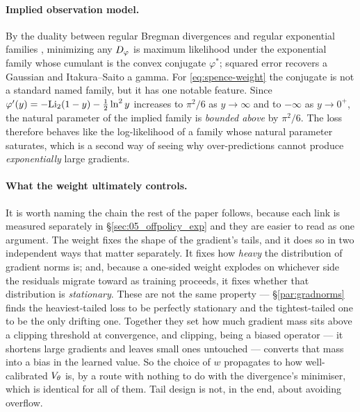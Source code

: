 \paragraph{Implied observation model.}
By the duality between regular Bregman divergences and regular exponential
families \citep{banerjee2005clustering,azoury2001relative}, minimizing any $D_{\varphi}$ is maximum
likelihood under the exponential family whose cumulant is the convex conjugate
$\varphi^{*}$; squared error recovers a Gaussian and Itakura--Saito a gamma.
For \eqref{eq:spence-weight} the conjugate is not a standard named family, but
it has one notable feature. Since $\varphi'(y)=-\mathrm{Li}_2(1-y)-\tfrac12\ln^{2}y$
increases to $\pi^{2}/6$ as $y\to\infty$ and to $-\infty$ as $y\to0^{+}$, the
natural parameter of the implied family is \emph{bounded above} by
$\pi^{2}/6$. The loss therefore behaves like the log-likelihood of a family
whose natural parameter saturates, which is a second way of seeing why
over-predictions cannot produce \emph{exponentially} large gradients.

\paragraph{What the weight ultimately controls.}
It is worth naming the chain the rest of the paper follows, because each link
is measured separately in \S\ref{sec:05_offpolicy_exp} and they are easier to
read as one argument. The weight fixes the shape of the gradient's tails, and it does so in two
independent ways that matter separately. It fixes how \emph{heavy} the
distribution of gradient norms is; and, because a one-sided weight explodes on
whichever side the residuals migrate toward as training proceeds, it fixes
whether that distribution is \emph{stationary}. These are not the same
property --- \S\ref{par:gradnorms} finds the heaviest-tailed loss to be
perfectly stationary and the tightest-tailed one to be the only drifting one.
Together they set how much gradient mass sits above a clipping threshold at
convergence, and clipping, being a biased operator --- it shortens large
gradients and leaves small ones untouched --- converts that mass into a bias in
the learned value. So the choice of $w$ propagates to how well-calibrated
$V_\theta$ is, by a route with nothing to do with the divergence's minimiser,
which is identical for all of them. Tail design is not, in the end, about
avoiding overflow.

